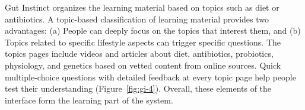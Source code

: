 Gut Instinct organizes the learning material based on topics such as diet or antibiotics. A topic-based classification of learning material provides two advantages: (a) People can deeply focus on the topics that interest them, and (b) Topics related to specific lifestyle aspects can trigger specific questions. The topics pages include videos and articles about diet, antibiotics, probiotics, physiology, and genetics based on vetted content from online sources. Quick multiple-choice questions with detailed feedback at every topic page help people test their understanding (Figure~\ref{fig:gi-4}). Overall, these elements of the interface form the learning part of the system. 





